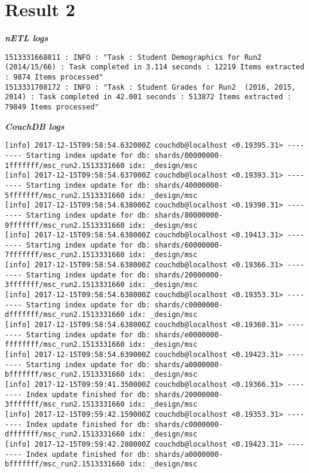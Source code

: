\section{Result 2}
\textit{\textbf{nETL logs}}
\begin{verbatim}
1513331668811 : INFO : "Task : Student Demographics for Run2 (2014/15/66) : Task completed in 3.114 seconds : 12219 Items extracted : 9874 Items processed"
1513331708172 : INFO : "Task : Student Grades for Run2  (2016, 2015, 2014) : Task completed in 42.001 seconds : 513872 Items extracted : 79849 Items processed"
\end{verbatim}

\textit{\textbf{CouchDB logs}}
\begin{verbatim}
[info] 2017-12-15T09:58:54.632000Z couchdb@localhost <0.19395.31> -------- Starting index update for db: shards/00000000-1fffffff/msc_run2.1513331660 idx: _design/msc
[info] 2017-12-15T09:58:54.637000Z couchdb@localhost <0.19393.31> -------- Starting index update for db: shards/40000000-5fffffff/msc_run2.1513331660 idx: _design/msc
[info] 2017-12-15T09:58:54.638000Z couchdb@localhost <0.19390.31> -------- Starting index update for db: shards/80000000-9fffffff/msc_run2.1513331660 idx: _design/msc
[info] 2017-12-15T09:58:54.638000Z couchdb@localhost <0.19413.31> -------- Starting index update for db: shards/60000000-7fffffff/msc_run2.1513331660 idx: _design/msc
[info] 2017-12-15T09:58:54.638000Z couchdb@localhost <0.19366.31> -------- Starting index update for db: shards/20000000-3fffffff/msc_run2.1513331660 idx: _design/msc
[info] 2017-12-15T09:58:54.638000Z couchdb@localhost <0.19353.31> -------- Starting index update for db: shards/c0000000-dfffffff/msc_run2.1513331660 idx: _design/msc
[info] 2017-12-15T09:58:54.638000Z couchdb@localhost <0.19360.31> -------- Starting index update for db: shards/e0000000-ffffffff/msc_run2.1513331660 idx: _design/msc
[info] 2017-12-15T09:58:54.639000Z couchdb@localhost <0.19423.31> -------- Starting index update for db: shards/a0000000-bfffffff/msc_run2.1513331660 idx: _design/msc
[info] 2017-12-15T09:59:41.350000Z couchdb@localhost <0.19366.31> -------- Index update finished for db: shards/20000000-3fffffff/msc_run2.1513331660 idx: _design/msc
[info] 2017-12-15T09:59:42.159000Z couchdb@localhost <0.19353.31> -------- Index update finished for db: shards/c0000000-dfffffff/msc_run2.1513331660 idx: _design/msc
[info] 2017-12-15T09:59:42.280000Z couchdb@localhost <0.19423.31> -------- Index update finished for db: shards/a0000000-bfffffff/msc_run2.1513331660 idx: _design/msc

\end{verbatim}
